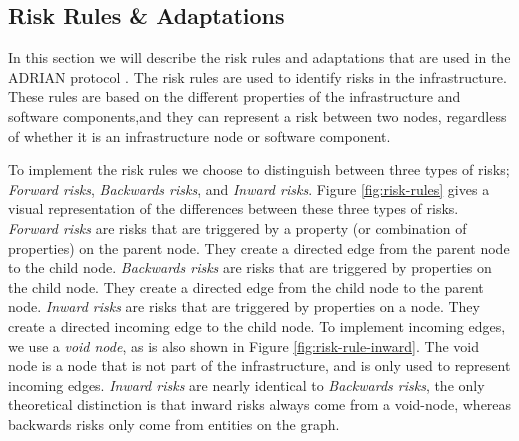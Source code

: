 

\subsection{Risk Rules \& Adaptations}
\label{ssec:risk-rules-adaptaions}
In this section we will describe the risk rules and adaptations that are used in the ADRIAN protocol \cite{mann2023ADRIAN}. The risk rules are used to identify risks in the infrastructure. These rules are based on the different properties of the infrastructure and software components,and they can represent a risk between two nodes, regardless of whether it is an infrastructure node or software component.

To implement the risk rules we choose to distinguish between three types of risks; \emph{Forward risks}, \emph{Backwards risks}, and \emph{Inward risks}. Figure \ref{fig:risk-rules} gives a visual representation of the differences between these three types of risks. 
\emph{Forward risks} are risks that are triggered by a property (or combination of properties) on the parent node. They create a directed edge from the parent node to the child node. 
\emph{Backwards risks} are risks that are triggered by properties on the child node. They create a directed edge from the child node to the parent node. 
\emph{Inward risks} are risks that are triggered by properties on a node. They create a directed incoming edge to the child node. To implement incoming edges, we use a \emph{void node}, as is also shown in Figure \ref{fig:risk-rule-inward}. The void node is a node that is not part of the infrastructure, and is only used to represent incoming edges.
\emph{Inward risks} are nearly identical to \emph{Backwards risks}, the only theoretical distinction is that inward risks always come from a void-node, whereas backwards risks only come from entities on the graph. 


